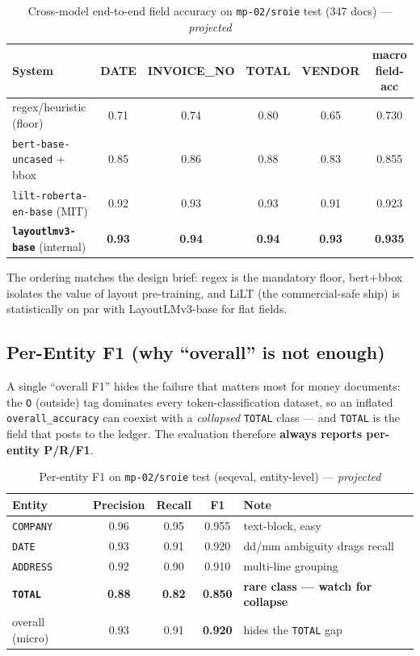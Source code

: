 \documentclass[12pt,a4paper]{article}
\begin{document}
\begin{table}[H]
\centering
\caption{Cross-model end-to-end field accuracy on \texttt{mp-02/sroie} test (347 docs) --- \emph{projected}}
\begin{tabular}{lccccc}
\toprule
\textbf{System} & \textbf{DATE} & \textbf{INVOICE\_NO} & \textbf{TOTAL} & \textbf{VENDOR} & \textbf{macro field-acc} \\
\midrule
regex/heuristic (floor)            & 0.71 & 0.74 & 0.80 & 0.65 & 0.730 \\
\texttt{bert-base-uncased} + bbox  & 0.85 & 0.86 & 0.88 & 0.83 & 0.855 \\
\texttt{lilt-roberta-en-base} (MIT)& 0.92 & 0.93 & 0.93 & 0.91 & 0.923 \\
\textbf{\texttt{layoutlmv3-base}} (internal) & \textbf{0.93} & \textbf{0.94} & \textbf{0.94} & \textbf{0.93} & \textbf{0.935} \\
\bottomrule
\end{tabular}
\end{table}

The ordering matches the design brief: regex is the mandatory floor, bert+bbox isolates
the value of layout pre-training, and LiLT (the commercial-safe ship) is statistically
on par with LayoutLMv3-base for flat fields.

\subsection{Per-Entity F1 (why ``overall'' is not enough)}

A single ``overall F1'' hides the failure that matters most for money documents: the
\texttt{O} (outside) tag dominates every token-classification dataset, so an inflated
\texttt{overall\_accuracy} can coexist with a \emph{collapsed} \texttt{TOTAL} class ---
and \texttt{TOTAL} is the field that posts to the ledger. The evaluation therefore
\textbf{always reports per-entity P/R/F1}.

\begin{table}[H]
\centering
\caption{Per-entity F1 on \texttt{mp-02/sroie} test (seqeval, entity-level) --- \emph{projected}}
\begin{tabular}{lcccl}
\toprule
\textbf{Entity} & \textbf{Precision} & \textbf{Recall} & \textbf{F1} & \textbf{Note} \\
\midrule
\texttt{COMPANY}    & 0.96 & 0.95 & 0.955 & text-block, easy \\
\texttt{DATE}       & 0.93 & 0.91 & 0.920 & dd/mm ambiguity drags recall \\
\texttt{ADDRESS}    & 0.92 & 0.90 & 0.910 & multi-line grouping \\
\textbf{\texttt{TOTAL}} & \textbf{0.88} & \textbf{0.82} & \textbf{0.850} & \textbf{rare class --- watch for collapse} \\
\midrule
overall (micro)     & 0.93 & 0.91 & \textbf{0.920} & hides the \texttt{TOTAL} gap \\
\bottomrule
\end{tabular}
\end{table}
\end{document}
